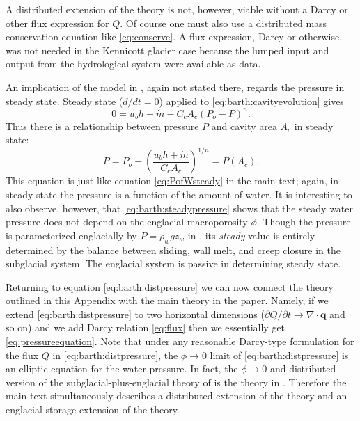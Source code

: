 \documentclass[11pt,final]{amsart}
\newcommand\bq{\mathbf{q}}
\newcommand{\Div}{\nabla\cdot}
\begin{document}
A distributed extension of the \cite{Bartholomausetal2011} theory is not, however, viable without a Darcy or other flux expression for $Q$.  Of course one must also use a distributed mass conservation equation like \eqref{eq:conserve}.  A flux expression, Darcy or otherwise, was not needed in the Kennicott glacier case because the lumped input and output from the hydrological system were available as data.

An implication of the model in \cite{Bartholomausetal2011}, again not stated there, regards the pressure in steady state.  Steady state ($d/dt = 0$) applied to \eqref{eq:barth:cavityevolution} gives
\begin{equation*}
0 = u_b h + \dot m - C_c A_c (P_o-P)^n.
\end{equation*}
Thus there is a relationship between pressure $P$ and cavity area $A_c$ in steady state:
\begin{equation}
P = P_o - \left(\frac{u_b h + \dot m}{C_c A_c}\right)^{1/n} = P(A_c). \label{eq:barth:steadypressure}
\end{equation}
This equation is just like equation \eqref{eq:PofWsteady} in the main text; again, in steady state the pressure is a function of the amount of water.  It is interesting to also observe, however, that \eqref{eq:barth:steadypressure} shows that the steady water pressure does not depend on the englacial macroporosity $\phi$.  Though the pressure is parameterized englacially by $P=\rho_w g z_w$ in \cite{Bartholomausetal2011}, its \emph{steady} value is entirely determined by the balance between sliding, wall melt, and creep closure in the subglacial system.  The englacial system is passive in determining steady state.

Returning to equation \eqref{eq:barth:distpressure} we can now connect the theory outlined in this Appendix with the main theory in the paper.  Namely, if we extend \eqref{eq:barth:distpressure} to two horizontal dimensions ($\partial Q/\partial t \to \Div \bq$ and so on) and we add Darcy relation \eqref{eq:flux} then we essentially get \eqref{eq:pressureequation}.  Note that under any reasonable Darcy-type formulation for the flux $Q$ in \eqref{eq:barth:distpressure}, the $\phi\to 0$ limit of \eqref{eq:barth:distpressure} is an elliptic equation for the water pressure.  In fact, the $\phi\to 0$ and distributed version of the subglacial-plus-englacial theory of \cite{Bartholomausetal2011} is the theory in \cite{Schoofetal2012}.  Therefore the main text simultaneously describes a distributed extension of the \cite{Bartholomausetal2011} theory and an englacial storage extension of the \cite{Schoofetal2012} theory.
\end{document}
